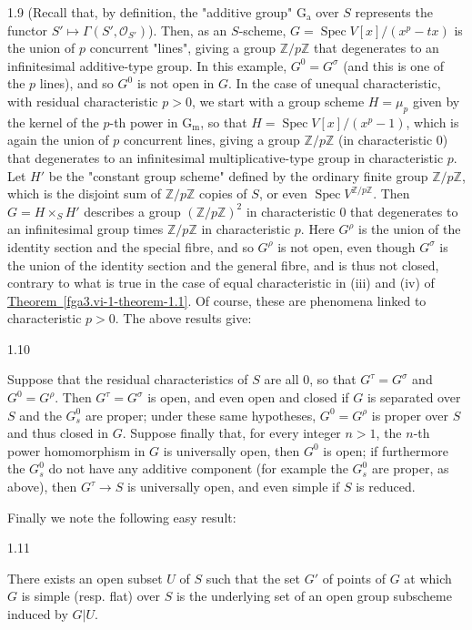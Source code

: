 \begin{remarks}{1.9}
    (Recall that, by definition, the "additive group" \(\operatorname {G_a}\) over \(S\) represents the functor \(S'\mapsto \Gamma (S',\mathcal {O}_{S'})\)).
    Then, as an \(S\)-scheme, \(G=\operatorname {Spec} V[x]/(x^p-tx)\) is the union of \(p\) concurrent "lines", giving a group \(\mathbb {Z}/p\mathbb {Z}\) that degenerates to an infinitesimal additive-type group.
    In this example, \(G^0=G^\sigma \) (and this is one of the \(p\) lines), and so \(G^0\) is not open in \(G\).
    In the case of unequal characteristic, with residual characteristic \(p>0\), we start with a group scheme \(H=\mu _p\) given by the kernel of the \(p\)-th power in \(\operatorname {G_m}\), so that \(H=\operatorname {Spec} V[x]/(x^p-1)\), which is again the union of \(p\) concurrent lines, giving a group \(\mathbb {Z}/p\mathbb {Z}\) (in characteristic \(0\)) that degenerates to an infinitesimal multiplicative-type group in characteristic \(p\).
    Let \(H'\) be the "constant group scheme" defined by the ordinary finite group \(\mathbb {Z}/p\mathbb {Z}\), which is the disjoint sum of \(\mathbb {Z}/p\mathbb {Z}\) copies of \(S\), or even \(\operatorname {Spec} V^{\mathbb {Z}/p\mathbb {Z}}\).
    Then \(G=H\times _S H'\) describes a group \((\mathbb {Z}/p\mathbb {Z})^2\) in characteristic \(0\) that degenerates to an infinitesimal group times \(\mathbb {Z}/p\mathbb {Z}\) in characteristic \(p\).
    Here \(G^\rho \) is the union of the identity section and the special fibre, and so \(G^\rho \) is not open, even though \(G^\sigma \) is the union of the identity section and the general fibre, and is thus not closed, contrary to what is true in the case of equal characteristic in (iii) and (iv) of \hyperref[fga3.vi-1-theorem-1.1]{Theorem~\ref*{fga3.vi-1-theorem-1.1}}.
    Of course, these are phenomena linked to characteristic \(p>0\).
    The above results give:\end{remarks}\begin{corollary}{1.10}\label{fga3.vi-1-corollary-1.10}\skipsinglepar\par{}Suppose that the residual characteristics of \(S\) are all \(0\), so that \(G^\tau =G^\sigma \) and \(G^0=G^\rho \).
    Then \(G^\tau =G^\sigma \) is open, and even open and closed if \(G\) is separated over \(S\) and the \(G_s^0\) are proper;
    under these same hypotheses, \(G^0=G^\rho \) is proper over \(S\) and thus closed in \(G\).
    Suppose finally that, for every integer \(n>1\), the \(n\)-th power homomorphism in \(G\) is universally open, then \(G^0\) is open;
    if furthermore the \(G_s^0\) do not have any additive component (for example the \(G_s^0\) are proper, as above), then \(G^\tau \to  S\) is universally open, and even simple if \(S\) is reduced.\end{corollary}\par{}Finally we note the following easy result:\begin{proposition}{1.11}\label{fga3.vi-1-proposition-1.11}\skipsinglepar\par{}There exists an open subset \(U\) of \(S\) such that the set \(G'\) of points of \(G\) at which \(G\) is simple (resp. flat) over \(S\) is the underlying set of an open group subscheme induced by \(G|U\).

\end{proposition}
